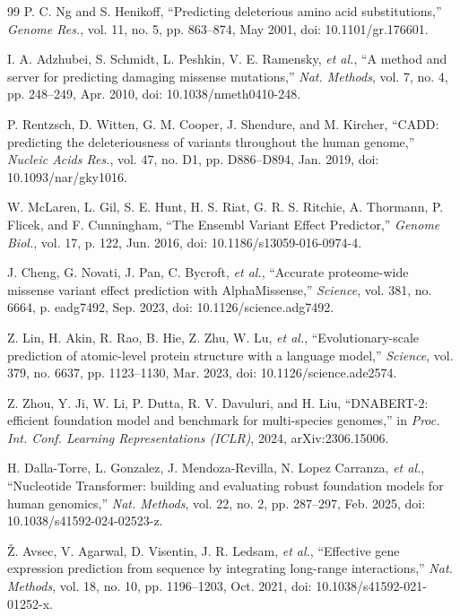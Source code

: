 \documentclass[10pt,journal,a4paper]{IEEEtran}
\begin{document}
\begin{thebibliography}{99}
 P. C. Ng and S. Henikoff, ``Predicting deleterious amino acid substitutions,'' \textit{Genome Res.}, vol. 11, no. 5, pp. 863--874, May 2001, doi: 10.1101/gr.176601.

 I. A. Adzhubei, S. Schmidt, L. Peshkin, V. E. Ramensky, \emph{et al.}, ``A method and server for predicting damaging missense mutations,'' \textit{Nat. Methods}, vol. 7, no. 4, pp. 248--249, Apr. 2010, doi: 10.1038/nmeth0410-248.

 P. Rentzsch, D. Witten, G. M. Cooper, J. Shendure, and M. Kircher, ``CADD: predicting the deleteriousness of variants throughout the human genome,'' \textit{Nucleic Acids Res.}, vol. 47, no. D1, pp. D886--D894, Jan. 2019, doi: 10.1093/nar/gky1016.

 W. McLaren, L. Gil, S. E. Hunt, H. S. Riat, G. R. S. Ritchie, A. Thormann, P. Flicek, and F. Cunningham, ``The Ensembl Variant Effect Predictor,'' \textit{Genome Biol.}, vol. 17, p. 122, Jun. 2016, doi: 10.1186/s13059-016-0974-4.

 J. Cheng, G. Novati, J. Pan, C. Bycroft, \emph{et al.}, ``Accurate proteome-wide missense variant effect prediction with AlphaMissense,'' \textit{Science}, vol. 381, no. 6664, p. eadg7492, Sep. 2023, doi: 10.1126/science.adg7492.

 Z. Lin, H. Akin, R. Rao, B. Hie, Z. Zhu, W. Lu, \emph{et al.}, ``Evolutionary-scale prediction of atomic-level protein structure with a language model,'' \textit{Science}, vol. 379, no. 6637, pp. 1123--1130, Mar. 2023, doi: 10.1126/science.ade2574.

 Z. Zhou, Y. Ji, W. Li, P. Dutta, R. V. Davuluri, and H. Liu, ``DNABERT-2: efficient foundation model and benchmark for multi-species genomes,'' in \textit{Proc. Int. Conf. Learning Representations (ICLR)}, 2024, arXiv:2306.15006.

 H. Dalla-Torre, L. Gonzalez, J. Mendoza-Revilla, N. Lopez Carranza, \emph{et al.}, ``Nucleotide Transformer: building and evaluating robust foundation models for human genomics,'' \textit{Nat. Methods}, vol. 22, no. 2, pp. 287--297, Feb. 2025, doi: 10.1038/s41592-024-02523-z.

 \v{Z}. Avsec, V. Agarwal, D. Visentin, J. R. Ledsam, \emph{et al.}, ``Effective gene expression prediction from sequence by integrating long-range interactions,'' \textit{Nat. Methods}, vol. 18, no. 10, pp. 1196--1203, Oct. 2021, doi: 10.1038/s41592-021-01252-x.


\end{thebibliography}
\end{document}
